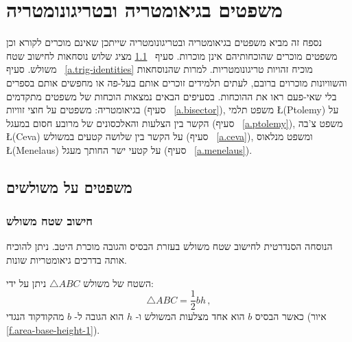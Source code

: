 

\chapter{משפטים בגיאומטריה ובטריגונומטריה}\label{a.trig}


נספח זה מביא משפטים בגיאומטריה ובטריגונומטריה שייתכן שאינם מוכרים לקורא וכן משפטים מוכרים שהוכחותיהם אינן מוכרות. סעיף%
~\ref{a.triangles}
מציג שלוש נוסחאות לחישוב שטח משולש. סעיף%
~\ref{a.trig-identities}
מוכיח זהויות טריגונומטריות. למרות שהנוסחאות והשוויונות מוכרוים ברובם, לעתים תלמידים זוכרים אותם בעל-פה או מחפשים אותם בספרים בלי שאי-פעם ראו את ההוכחות. בסעיפים הבאים נמצאות הוכחות של משפטים מתקדמים בגיאומטריה: משפטים על חוצי זוויות (סעיף%
~\ref{a.bisector}),
משפט תלמי
\L{(Ptolemy)}
על הקשר בין הצלעות והאלכסונים של מרובע חסום במעגל (סעיף%
~\ref{a.ptolemy}),
משפט צ'בה
\L{(Ceva)}
על הקשר בין שלושה קטעים במשולש (סעיף%
~\ref{a.ceva}),
ומשפט מנלאוס
\L{(Menelaus)}
על קטעי ישר החותך מעגל (סעיף%
~\ref{a.menelaus}).


\section{משפטים על משולשים}\label{a.triangles}



\subsection{חישוב שטח משולש}

הנוסחה הסנדרטית לחישוב שטח משולש בעזרת הבסיס והגובה מוכרת היטב. ניתן להוכיח אותה בדרכים גיאומטריות שונות.

\begin{theorem} 
השטח של משולש 
$\triangle ABC$
ניתן על ידי:
\begin{equation}\label{eq.area-from-base}
\triangle ABC=\frac{1}{2}bh\,,
\end{equation}
כאשר הבסיס 
$b$
הוא אחד מצלעות המשולש ו-%
$h$
הוא הגובה ל-%
$b$
מהקודקוד הנגדי
(איור~%
\ref{f.area-base-height-1}).
\end{theorem}

